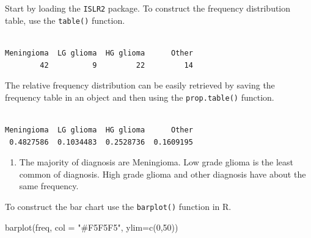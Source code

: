 \documentclass[
  letterpaper,
  DIV=11,
  numbers=noendperiod]{scrreprt}
\newenvironment{Shaded}{\begin{snugshade}}{\end{snugshade}}
\newcommand{\AttributeTok}[1]{\textcolor[rgb]{0.40,0.45,0.13}{#1}}
\newcommand{\DecValTok}[1]{\textcolor[rgb]{0.68,0.00,0.00}{#1}}
\newcommand{\FunctionTok}[1]{\textcolor[rgb]{0.28,0.35,0.67}{#1}}
\newcommand{\NormalTok}[1]{\textcolor[rgb]{0.00,0.23,0.31}{#1}}
\newcommand{\OtherTok}[1]{\textcolor[rgb]{0.00,0.23,0.31}{#1}}
\newcommand{\SpecialCharTok}[1]{\textcolor[rgb]{0.37,0.37,0.37}{#1}}
\newcommand{\StringTok}[1]{\textcolor[rgb]{0.13,0.47,0.30}{#1}}
\providecommand{\tightlist}{%
  \setlength{\itemsep}{0pt}\setlength{\parskip}{0pt}}\usepackage{longtable,booktabs,array}
\begin{document}
Start by loading the \texttt{ISLR2} package. To construct the frequency
distribution table, use the \texttt{table()} function.

\begin{Shaded}
\end{Shaded}

\begin{verbatim}

Meningioma  LG glioma  HG glioma      Other 
        42          9         22         14 
\end{verbatim}

The relative frequency distribution can be easily retrieved by saving
the frequency table in an object and then using the
\texttt{prop.table()} function.

\begin{Shaded}
\end{Shaded}

\begin{verbatim}

Meningioma  LG glioma  HG glioma      Other 
 0.4827586  0.1034483  0.2528736  0.1609195 
\end{verbatim}

\begin{blackbox}

\begin{enumerate}
\def\labelenumi{\arabic{enumi}.}
\setcounter{enumi}{1}
\tightlist
\item
  The majority of diagnosis are Meningioma. Low grade glioma is the
  least common of diagnosis. High grade glioma and other diagnosis have
  about the same frequency.
\end{enumerate}

\end{blackbox}

To construct the bar chart use the \texttt{barplot()} function in R.

\begin{Shaded}
\begin{Highlighting}[numbers=left,,]
\FunctionTok{barplot}\NormalTok{(freq, }\AttributeTok{col =} \StringTok{"\#F5F5F5"}\NormalTok{, }\AttributeTok{ylim=}\FunctionTok{c}\NormalTok{(}\DecValTok{0}\NormalTok{,}\DecValTok{50}\NormalTok{))}
\end{Highlighting}
\end{Shaded}
\end{document}
